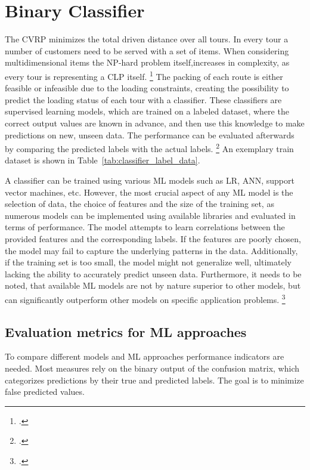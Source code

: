 \chapter{Binary Classifier}
\label{chap:classifier}

The \gls{CVRP} minimizes the total driven distance over all tours. In every tour
a number of customers need to be served with a set of items. When considering multidimensional items
the NP-hard problem itself,increases in complexity, as every tour is representing a \gls{CLP} itself. \footcite[cf.][p. 1f]{tamke_branch-and-cut_2024}
The packing of each route is either feasible or infeasible due to the loading constraints,
creating the possibility to predict the loading status of each tour with a classifier.
These classifiers are supervised learning models, which are trained on a labeled dataset,
where the correct output values are known in advance, and then use this knowledge to
make predictions on new, unseen data. The performance can be evaluated afterwards by comparing
the predicted labels with the actual labels. \footcite[cf.][]{kotsiantis_supervised_2007}
An exemplary train dataset is shown in Table~\ref{tab:classifier_label_data}.



A classifier can be trained using various \gls{ML} models such as \gls{LR},
\gls{ANN}, support vector machines, etc. However, the most crucial aspect of any
\gls{ML} model is the selection of data, the choice of features and the size of the training set,
as numerous models can be implemented using available libraries and evaluated in terms of performance.
The model attempts to learn correlations between the provided features
and the corresponding labels. If the features are poorly chosen, the model may fail
to capture the underlying patterns in the data. Additionally, if the training set
is too small, the model might not generalize well, ultimately lacking the ability
to accurately predict unseen data. Furthermore, it needs to be noted, that available
\gls{ML} models are not by nature superior to other models, but can significantly outperform
other models on specific application problems. \footcite[cf.][pp. 250, 264]{kotsiantis_supervised_2007}


\section{Evaluation metrics for ML approaches}
\label{sec:classifier_objectives}
To compare different models and \gls{ML} approaches performance indicators are needed. Most measures rely
on the binary output of the confusion matrix, which categorizes predictions by their true and predicted labels.
The goal is to minimize false predicted values.

